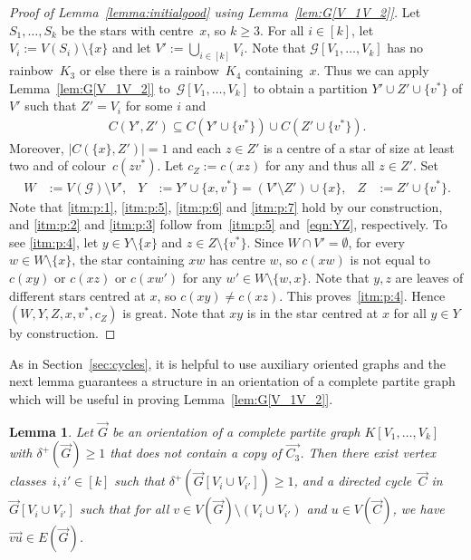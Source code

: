 \documentclass[a4paper, 12pt]{article}
\numberwithin{equation}{section}
\newtheorem{lemma}[theorem]{Lemma}
\def\sm{{\setminus}}
\newcommand{\ova}[1]{\overrightarrow{#1}}
\newcommand{\ms}[1]{\mathscr{#1}}
\begin{document}
\begin{proof}[Proof of Lemma~\ref{lemma:initialgood} using Lemma~\ref{lem:G[V_1V_2]}]
Let $S_1, \dots, S_k$ be the stars with centre~$x$, so $k \ge 3$. 
For all $i \in [k]$, let $V_i := V(S_i) \setminus \{x\}$
and let $V'  := \bigcup_{i \in [k]} V_i$.
Note that $\ms{G}[V_1,\ldots,V_k]$ has no rainbow~$K_3$ or else there is a rainbow~$K_4$ containing~$x$. 
Thus we can apply Lemma~\ref{lem:G[V_1V_2]} to~$\ms{G}[V_1,\ldots,V_k]$ to obtain a partition $Y'\cup Z'\cup \{v^*\}$ of $V'$ such that  $Z'=V_i$ for some $i$ and
\begin{align}
C(Y',Z') \subseteq C(Y' \cup \{v^*\}) \cup C(Z' \cup \{v^*\}).\label{eqn:YZ}
\end{align}
Moreover, $|C(\{x\},Z')| = 1$  and each $z \in Z'$ is a centre of a star of size at least two and of colour~$c(zv^*)$. Let $c_Z := c(xz)$ for any and thus all $ z \in Z'$. 
Set  
\begin{align*}
	W &:= V(\ms{G}) \sm V', &
	Y &:= Y' \cup \{x,v^*\} = (V' \setminus Z') \cup\{x\}, &
	Z &:= Z' \cup \{v^*\}.
\end{align*}
Note that \ref{itm:p:1}, \ref{itm:p:5}, \ref{itm:p:6} and \ref{itm:p:7} hold by our construction, and \ref{itm:p:2} and \ref{itm:p:3} follow from~\ref{itm:p:5} and~\eqref{eqn:YZ}, respectively. 
To see \ref{itm:p:4}, let $y \in Y \setminus \{x\}$ and $z \in Z \setminus \{ v^*\}$. 
Since $W \cap V' = \emptyset$, for every $w \in W \setminus \{x\}$, the star containing $xw$ has centre $w$, so $c(xw)$ is not equal to $c(xy)$ or $c(xz)$ or $c(xw')$ for any $w' \in W \sm\{w,x\}$. 
Note that $y,z$ are leaves of different stars centred at $x$, so $c(xy) \neq c(xz)$.
This proves~\ref{itm:p:4}.
Hence $(W,Y,Z,x,v^*,c_Z)$ is great. 
Note that $xy$ is in the star centred at $x$ for all $y \in Y$ by construction.
\end{proof}



As in Section~\ref{sec:cycles}, it is helpful to use auxiliary oriented graphs and the next lemma guarantees a structure in an orientation of a complete partite graph which will be useful in proving Lemma~\ref{lem:G[V_1V_2]}.

\begin{lemma} \label{lem:partite}
Let $\ova{G}$ be an orientation of a complete partite graph $K[V_1,\ldots,V_k]$ with $\delta^+(\ova{G}) \ge 1$ that does not contain a copy of $\ova{C_3}$. 
Then there exist vertex classes~$i,i' \in [k]$ 
 such that $\delta^+(\ova{G}[V_i \cup V_{i'}]) \ge 1$, 
 and a directed cycle~$\ova{C}$ in $\ova{G}[V_i \cup V_{i'}]$ such that 
for all $v \in V(\ova{G}) \setminus (V_i \cup V_{i'})$ and $u \in V(\ova{C})$, we have $\ova{vu}\in E(\ova{G})$.
\end{lemma}
\end{document}
